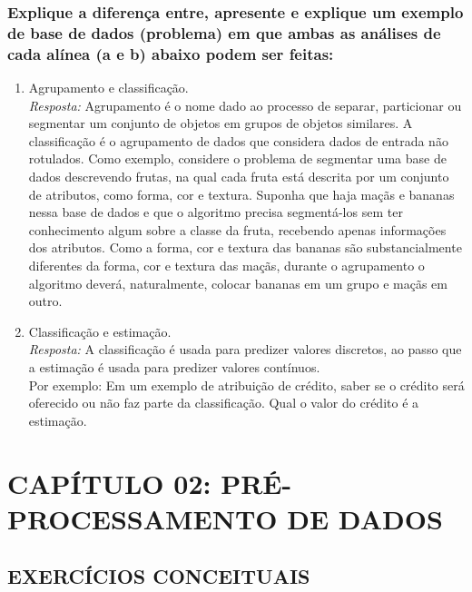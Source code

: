 \documentclass{article}
\begin{document}
\subsubsection{Explique a diferença entre, apresente e explique um exemplo de base de dados (problema) em que ambas as análises de cada alínea (a e b) abaixo podem ser feitas:}
\begin{enumerate}[label=\alph*]
  \item Agrupamento e classificação.\\
  \textit{Resposta:} Agrupamento é o nome dado ao processo de separar, particionar ou segmentar um conjunto de objetos em grupos de objetos similares. A classificação é o agrupamento de dados que considera dados de entrada não rotulados.
  Como exemplo, considere o problema de segmentar uma base de dados descrevendo frutas, na qual cada fruta está descrita por um conjunto de atributos, como forma, cor e textura. Suponha que haja maçãs e bananas nessa base de dados e que o algoritmo precisa segmentá-los sem ter conhecimento algum sobre a classe da fruta, recebendo apenas informações dos atributos. Como a forma, cor e textura das bananas são substancialmente diferentes da forma, cor e textura das maçãs, durante o agrupamento o algoritmo deverá, naturalmente, colocar bananas em um grupo e maçãs em outro. 

  \item Classificação e estimação.\\
  \textit{Resposta:} A classificação é usada para predizer valores discretos, ao passo que a estimação é usada para predizer valores contínuos. \\
  Por exemplo: Em um exemplo de atribuição de crédito, saber se o crédito será oferecido ou não faz parte da classificação. Qual o valor do crédito é a estimação.
\end{enumerate}


\section{CAPÍTULO 02: PRÉ-PROCESSAMENTO DE DADOS}
\subsection{EXERCÍCIOS CONCEITUAIS}
\end{document}
